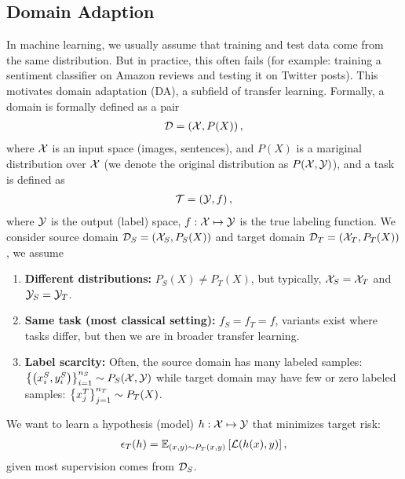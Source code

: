 \documentclass[11pt]{article}  %
\begin{document}
\subsection{Domain Adaption}
In machine learning, we usually assume that training and test data come from the same distribution.
But in practice, this often fails (for example: training a sentiment classifier on Amazon reviews and testing it on Twitter posts).
This motivates domain adaptation (DA), a subfield of transfer learning.
Formally, a domain is formally defined as a pair 
\begin{align*}
  \mathcal{D} = \left( \mathcal{X}, P(X) \right),
\end{align*}
where $\mathcal{X}$ is an input space (images, sentences), and $P(X)$ is a mariginal distribution over $\mathcal{X}$ (we denote the original distribution as $P(\mathcal{X}, \mathcal{Y})$), and a task is defined as 
\begin{align*}
  \mathcal{T} = \left( \mathcal{Y}, f \right),
\end{align*}
where $\mathcal{Y}$ is the output (label) space, $f: \mathcal{X} \mapsto \mathcal{Y}$ is the true labeling function.
We consider source domain $\mathcal{D}_{S} = \left( \mathcal{X}_{S}, P_S(X) \right)$ and target domain $\mathcal{D}_{T} = \left( \mathcal{X}_{T}, P_T(X) \right)$, we assume 
\begin{enumerate}
  \item \textbf{Different distributions:} $P_{S}(X) \neq P_{T}(X)$, but typically, $\mathcal{X}_S = \mathcal{X}_T$ and $\mathcal{Y}_S = \mathcal{Y}_T$.
  \item \textbf{Same task (most classical setting):} $f_S = f_T = f$, variants exist where tasks differ, but then we are in broader transfer learning.
  \item \textbf{Label scarcity:} Often, the source domain has many labeled samples: $\left\{ \left( x_i^S, y_i^S \right) \right\}_{i=1}^{n_S} \sim P_S(\mathcal{X}, \mathcal{Y})$ while target domain may have few or zero labeled samples: $\left\{ x_j^T \right\}_{j=1}^{n_T} \sim P_T(X)$.
\end{enumerate}
We want to learn a hypothesis (model) $h: \mathcal{X} \mapsto \mathcal{Y}$ that minimizes target risk: 
\begin{align*}
  \epsilon_T(h) = \mathbb{E}_{(x, y)\sim P_T(x, y)}\left[\mathcal{L}(h(x), y)\right],
\end{align*}
given most supervision comes from $\mathcal{D}_S$.
\end{document}
